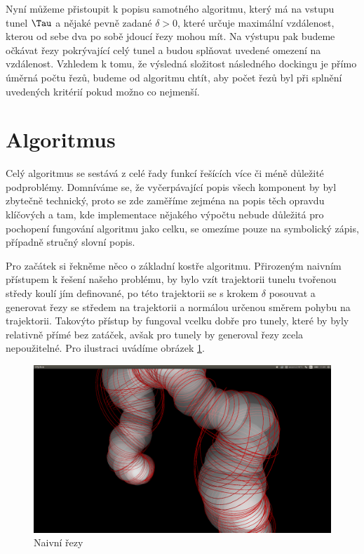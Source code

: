 Nyní můžeme přistoupit k popisu samotného algoritmu, který má na vstupu tunel $ \Tau $
a nějaké pevně zadané $ \delta > 0$, které určuje maximální vzdálenost, kterou
od sebe dva po sobě jdoucí řezy mohou mít. Na výstupu pak budeme očkávat řezy pokrývající
celý tunel a budou splňovat uvedené omezení na vzdálenost. Vzhledem k tomu, že výsledná
složitost následného dockingu je přímo úměrná počtu řezů, budeme od algoritmu chtít,
aby počet řezů byl při splnění uvedených kritérií pokud možno co nejmenší.


\section{Algoritmus}

Celý algoritmus se sestává z celé řady funkcí řešících více či méně důležité podproblémy.
Domníváme se, že vyčerpávající popis všech komponent by byl zbytečně technický,
proto se zde zaměříme zejména na popis těch opravdu klíčových
a tam, kde implementace nějakého výpočtu nebude důležitá pro pochopení fungování
algoritmu jako celku, se omezíme pouze na symbolický zápis, případně stručný slovní
popis.

Pro začátek si řekněme něco o základní kostře algoritmu. Přirozeným naivním přístupem
k řešení našeho problému, by bylo vzít trajektorii tunelu tvořenou středy koulí
jím definované, po této trajektorii se s krokem $ \delta $ posouvat a generovat
řezy se středem na trajektorii a normálou určenou směrem pohybu na trajektorii.
Takovýto přístup by fungoval vcelku dobře pro tunely, které by byly relativně
přímé bez zatáček, avšak pro  tunely by generoval řezy zcela nepoužitelné.
Pro ilustraci uvádíme obrázek \ref{fig:naive_cuts}.

\begin{figure}
    \centering
    \includegraphics[width=\textwidth]{img/naive_cuts.png}
    \caption{Naivní řezy}
  \centering
  \label{fig:naive_cuts}
\end{figure}

